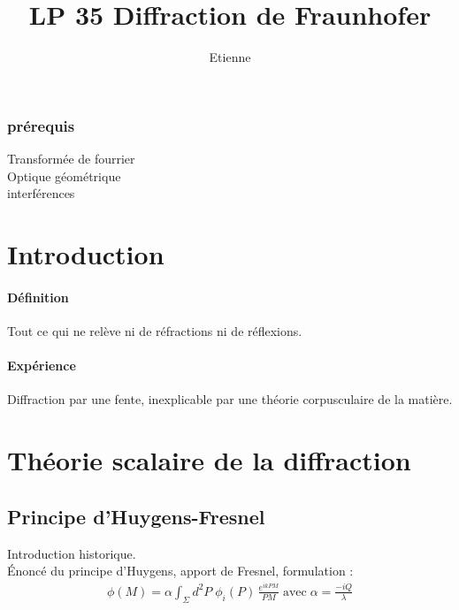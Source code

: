\documentclass[12pt,prb,aps,epsf]{report}
\begin{document}
	
	\title{LP 35 Diffraction de Fraunhofer}
	\author{Etienne}
	
	\maketitle
	
	\tableofcontents
	
	\pagebreak
	
	
\subsubsection{prérequis}
Transformée de fourrier\\
Optique géométrique\\
interférences

\section{Introduction}
\paragraph{Définition} Tout ce qui ne relève ni de réfractions ni de réflexions.\\
\paragraph{Expérience} Diffraction par une fente, inexplicable par une théorie corpusculaire de la matière.

\section{Théorie scalaire de la diffraction}
\subsection{Principe d'Huygens-Fresnel}
Introduction historique.\\
Énoncé du principe d'Huygens, apport de Fresnel, formulation :
\begin{eqnarray}
\phi(M) = \alpha \int_{\Sigma} d^2P\;\phi_i(P)\, \frac{e^{ikPM}}{PM}\;\mathrm{avec}\; \alpha = \frac{-iQ}{\lambda}
\end{eqnarray}
\end{document}
